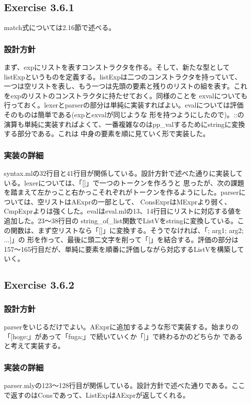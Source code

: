 \documentclass{jarticle}
\begin{document}
\subsection{Exercise 3.6.1}
match式については2.16節で述べる。
\subsubsection{設計方針}
まず、expにリストを表すコンストラクタを作る。そして、新たな型としてlistExpというものを定義する。listExpは二つのコンストラクタを持っていて、
一つは空リストを表し、もう一つは先頭の要素と残りのリストの組を表す。これをexpのリストのコンストラクタに持たせておく。同様のことを
exvalについても行っておく。lexerとparserの部分は単純に実装すればよい。evalについては評価そのものは簡単である(expとexvalが同じような
形を持つようにしたので)。::の演算も単純に実装すればよくて、一番複雑なのはpp\_valするためにstringに変換する部分である。これは
中身の要素を順に見ていく形で実装した。
\subsubsection{実装の詳細}
syntax.mlの32行目と41行目が関係している。設計方針で述べた通りに実装している。lexerについては、「[]」で一つのトークンを作ろうと
思ったが、次の課題を踏まえて左かっこと右かっこそれぞれがトークンを作るようにした。parserについては、空リストはAExprの一部として、
ConsExprはMExprより弱く、CmpExprよりは強くした。evalはeval.mlの13、14行目にリストに対応する値を追加した。23〜38行目の
string\_of\_list関数でListVをstringに変換している。この関数は、まず空リストなら「[]」に変換する。そうでなければ、「; arg1; arg2; ...]」の
形を作って、最後に頭二文字を削って「[」を結合する。評価の部分は157〜165行目だが、単純に要素を順番に評価しながら対応するListVを構築していく。

\subsection{Exercise 3.6.2}
\subsubsection{設計方針}
parserをいじるだけでよい。AExprに追加するような形で実装する。始まりの「[hoge;」があって「fuga;」で続いていくか「]」で終わるかのどちらか
であると考えて実装する。
\subsubsection{実装の詳細}
parser.mlyの123〜128行目が関係している。設計方針で述べた通りである。ここで返すのはConsであって、ListExpはAExprが返してくれる。
\end{document}

